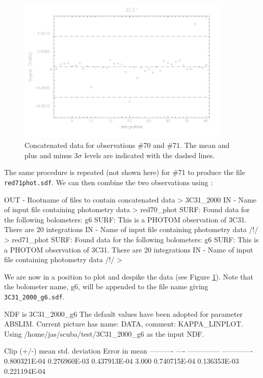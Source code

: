 \documentclass[twoside,11pt,fleqn,noabs]{starlink}
\providecommand{\task}[1]{\textsf{#1}}
\providecommand{\scucat}{\xref{\task{scucat}}{sun216}{SCUCAT}}
\begin{document}
\begin{figure}[t]
\begin{center}
\includegraphics[width=0.9\textwidth]{sc10_fig1}
\end{center}
\caption[Concatenated data for observations \#70 and \#71.]{Concatenated data for
 observations \#70 and \#71. The mean and plus and minus 3$\sigma$
 levels are indicated with the dashed lines.}
\label{f1}
\end{figure}

The same procedure is repeated (not shown here) for \#71 to produce
the file \texttt{red71phot.sdf}. We can then combine the two observations
using \scucat:

\begin{small}
\begin{terminalv}
OUT - Rootname of files to contain concatenated data > 3C31_2000
IN - Name of input file containing photometry data > red70_phot
SURF: Found data for the following bolometers: g6
SURF: This is a PHOTOM observation of 3C31. There are 20 integrations
IN - Name of input file containing photometry data /!/ > red71_phot
SURF: Found data for the following bolometers: g6
SURF: This is a PHOTOM observation of 3C31. There are 20 integrations
IN - Name of input file containing photometry data /!/ >
\end{terminalv}
\end{small}

We are now in a position to plot and despike the data (see Figure
\ref{f1}). Note that the bolometer name, g6, will be appended to the file
name giving \texttt{3C31\_2000\_g6.sdf}.

\begin{small}
\begin{terminalv}
NDF is 3C31_2000_g6
The default values have been adopted for parameter ABSLIM.
Current picture has name: DATA, comment: KAPPA_LINPLOT.
Using /home/jas/scuba/test/3C31_2000_g6 as the input NDF.

      Clip (+/-)         mean          std. deviation    Error in mean
      ----------         ----          --------------    -------------
                      0.800321E-04      0.276960E-03      0.437913E-04
         3.000        0.740715E-04      0.136353E-03      0.221194E-04
\end{terminalv}
\end{small}
\end{document}
